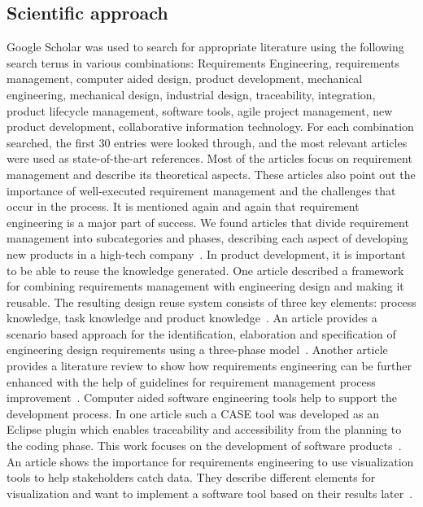     \subsection*{Scientific approach}
    Google Scholar was used to search for appropriate literature using the following search terms in various combinations: Requirements Engineering, requirements management, computer aided design, product development, mechanical engineering, mechanical design, industrial design, traceability, integration, product lifecycle management, software tools, agile project management, new product development, collaborative information technology. For each combination searched, the first 30 entries were looked through, and the most relevant articles were used as state-of-the-art references. Most of the articles focus on requirement management and describe its theoretical aspects. These articles also point out the importance of well-executed requirement management and the challenges that occur in the process. It is mentioned again and again that requirement engineering is a major part of success.
    We found articles that divide requirement management into subcategories and phases, describing each aspect of developing new products in a high-tech company~\cite{Ahti2005}.
    In product development, it is important to be able to reuse the knowledge generated. One article described a framework for combining requirements management with engineering design and making it reusable. The resulting design reuse system consists of three key elements: process knowledge, task knowledge and product knowledge~\cite{BAXTER2008585}.
    An article provides a scenario based approach for the identification, elaboration and specification of engineering design requirements using a three-phase model~\cite{liu2012scenario}.
    Another article provides a literature review to show how requirements engineering can be further enhanced with the help of guidelines for requirement management process improvement~\cite{Kauppinen2005}.
    Computer aided software engineering tools help to support the development process. In one article such a CASE tool was developed as an Eclipse plugin which enables traceability and accessibility from the planning to the coding phase. This work focuses on the development of software products~\cite{6976693}.
    An article shows the importance for requirements engineering to use visualization tools to help stakeholders catch data. They describe different elements for visualization and want to implement a software tool based on their results later~\cite{RICHTER2020271}.
